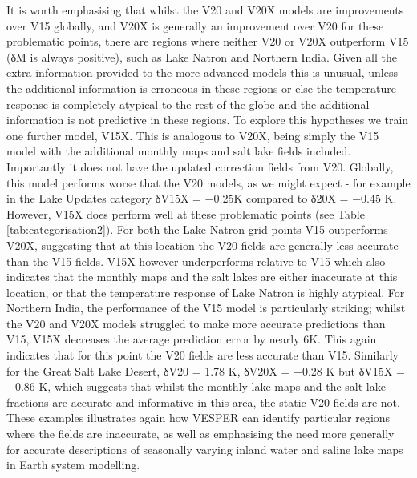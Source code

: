 \documentclass[hess, twostagejnl]{copernicus}
\begin{document}
It is worth emphasising that whilst the V20 and V20X models are improvements over V15 globally, and V20X is generally an improvement over V20 for these problematic points, there are regions where neither V20 or V20X outperform V15 (δM is always positive), such as Lake Natron and Northern India. Given all the extra information provided to the more advanced models this is unusual, unless the additional information is erroneous in these regions or else the temperature response is completely atypical to the rest of the globe and the additional information is not predictive in these regions. To explore this hypotheses we train one further model, V15X. This is analogous to V20X, being simply the V15 model with the additional monthly maps and salt lake fields included. Importantly it does not have the updated correction fields from V20. Globally, this model performs worse that the V20 models, as we might expect - for example in the Lake Updates category δV15X = −0.25K compared to δ20X = −0.45 K. However, V15X does perform well at these problematic points (see Table \ref{tab:categorisation2}). For both the Lake Natron grid points V15 outperforms V20X, suggesting that at this location the V20 fields are generally less accurate than the V15 fields. V15X however underperforms relative to V15 which also indicates that the monthly maps and the salt lakes are either inaccurate at this location, or that the temperature response of Lake Natron is highly atypical. For Northern India, the performance of the V15 model is particularly striking; whilst the V20 and V20X models struggled to make more accurate predictions than V15, V15X decreases the average prediction error by nearly 6K. This again indicates that for this point the V20 fields are less accurate than V15. Similarly for the Great Salt Lake Desert, δV20 = 1.78 K, δV20X = −0.28 K but δV15X = −0.86 K, which suggests that whilst the monthly lake maps and the salt lake fractions are accurate and informative in this area, the static V20 fields are not. These examples illustrates again how VESPER can identify particular regions where the fields are inaccurate, as well as emphasising the need more generally for accurate descriptions of seasonally varying inland water and saline lake maps in Earth system modelling.
\end{document}
